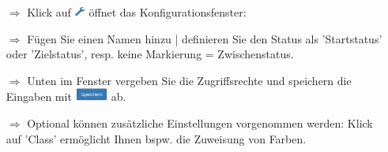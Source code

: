 \documentclass{article}
\begin{document}
\begin{multicols}{2}
\begin{tcolorbox}[colback=blue!5,colframe=blue!40!black,title=Workflows konfigurieren 1]
\begin{itemize}
\begin{centering}
\end{centering}
	
  \item[$\Longrightarrow$] Klick auf \includegraphics[height=10pt]{Icons/Schraubenschluessel.png} öffnet das Konfigurationsfenster:
  \item[$\Longrightarrow$] Fügen Sie einen Namen hinzu | definieren Sie den Status als 'Startstatus' oder 'Zielstatus', resp. keine Markierung = Zwischenstatus.
  \item[$\Longrightarrow$] Unten im Fenster vergeben Sie die Zugriffsrechte und speichern die Eingaben mit \includegraphics[height=12pt]{Icons/Speichern.png} ab.
	\item[$\Longrightarrow$] Optional können zusätzliche Einstellungen vorgenommen werden: Klick auf 'Class' ermöglicht Ihnen bspw. die Zuweisung von Farben.
\end{itemize}
\end{tcolorbox}

\end{multicols}

\vspace{\baselineskip}

\end{document}
